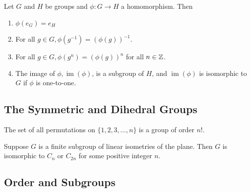 
\begin{theorem}
    Let \(G\) and \(H\) be groups and \(\phi: G \to H\) a homomorphism. Then
    \begin{enumerate}[label=\alph*)]
        \item \(\phi(e_G) = e_H\)
        \item For all \(g \in G, \phi(g^{-1}) = (\phi(g))^{-1}\).
        \item For all \(g \in G, \phi(g^n) = (\phi(g))^n\) for all \(n \in \mathbb{Z}\).
        \item The image of \(\phi, \operatorname*{im}(\phi)\), is a subgroup of \(H\), and \(\operatorname*{im}(\phi)\) is isomorphic to \(G\) if \(\phi\) is one-to-one.
    \end{enumerate}
\end{theorem}

\subsection{The Symmetric and Dihedral Groups}


\begin{theorem}
    The set of all permutations on \(\{1, 2, 3, \dots, n\}\) is a group of order \(n!\).
\end{theorem}



\begin{theorem}
    Suppose \(G\) is a finite subgroup of linear isometries of the plane. Then \(G\) is isomorphic to \(C_n\) or \(C_{2n}\) for some positive integer \(n\).
\end{theorem}

\subsection{Order and Subgroups}

